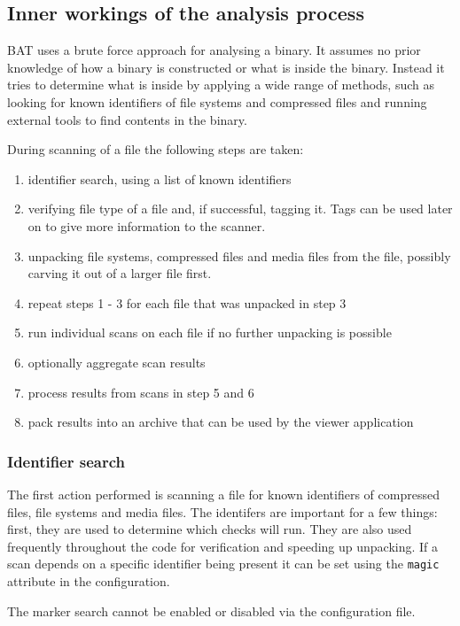 \documentclass[10pt]{article}
\begin{document}
\subsection{Inner workings of the analysis process}

BAT uses a brute force approach for analysing a binary. It assumes no prior
knowledge of how a binary is constructed or what is inside the binary. Instead
it tries to determine what is inside by applying a wide range of methods, such
as looking for known identifiers of file systems and compressed files and
running external tools to find contents in the binary.

During scanning of a file the following steps are taken:

\begin{enumerate}
\item identifier search, using a list of known identifiers
\item verifying file type of a file and, if successful, tagging it. Tags can
be used later on to give more information to the scanner.
\item unpacking file systems, compressed files and media files from the file,
possibly carving it out of a larger file first.
\item repeat steps 1 - 3 for each file that was unpacked in step 3
\item run individual scans on each file if no further unpacking is possible
\item optionally aggregate scan results
\item process results from scans in step 5 and 6
\item pack results into an archive that can be used by the viewer application
\end{enumerate}

\subsubsection{Identifier search}

The first action performed is scanning a file for known identifiers of
compressed files, file systems and media files. The identifers are important
for a few things: first, they are used to determine which checks will run. They
are also used frequently throughout the code for verification and speeding up
unpacking. If a scan depends on a specific identifier being present it can be
set using the \texttt{magic} attribute in the configuration.

The marker search cannot be enabled or disabled via the configuration file.
\end{document}
